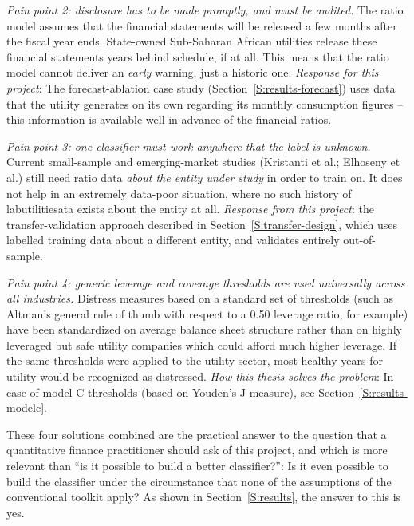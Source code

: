 \documentclass[final,1p,times]{elsarticle}
\begin{document}
\emph{Pain point 2: disclosure has to be made promptly, and must be audited.} The ratio model assumes that the financial statements will be released a few months after the fiscal year ends. State-owned Sub-Saharan African utilities release these financial statements years behind schedule, if at all. This means that the ratio model cannot deliver an \emph{early} warning, just a historic one. \emph{Response for this project}: The forecast-ablation case study (Section~\ref{S:results-forecast}) uses data that the utility generates on its own regarding its monthly consumption figures -- this information is available well in advance of the financial ratios.

\emph{Pain point 3: one classifier must work anywhere that the label is unknown.} Current small-sample and emerging-market studies (Kristanti et al.; Elhoseny et al.) still need ratio data \emph{about the entity under study} in order to train on. It does not help in an extremely data-poor situation, where no such history of labutilitiesata exists about the entity at all. \emph{Response from this project}: the transfer-validation approach described in Section~\ref{S:transfer-design}, which uses labelled training data about a different entity, and validates entirely out-of-sample.

\emph{Pain point 4: generic leverage and coverage thresholds are used universally across all industries.} Distress measures based on a standard set of thresholds (such as Altman's general rule of thumb with respect to a 0.50 leverage ratio, for example) have been standardized on average balance sheet structure rather than on highly leveraged but safe utility companies which could afford much higher leverage. If the same thresholds were applied to the utility sector, most healthy years for utility would be recognized as distressed. \emph{How this thesis solves the problem}: In case of model C thresholds (based on Youden's J measure), see Section~\ref{S:results-modelc}.

These four solutions combined are the practical answer to the question that a quantitative finance practitioner should ask of this project, and which is more relevant than ``is it possible to build a better classifier?'': Is it even possible to build the classifier under the circumstance that none of the assumptions of the conventional toolkit apply? As shown in Section~\ref{S:results}, the answer to this is yes.
\end{document}
